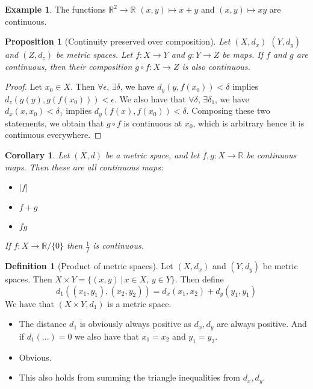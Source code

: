 \documentclass{article}
\theoremstyle{definition}
\newtheorem{defn}{Definition}[section]
\newtheorem{exmp}{Example}[section]
\theoremstyle{plain}%
\newtheorem{prop}[thm]{Proposition}
\newtheorem*{cor}{Corollary}
\theoremstyle{remark}
\begin{document}
\begin{exmp}
The functions $\mathbb{R}^2 \to \mathbb{R}$ $(x,y) \mapsto x+y$ and $(x,y) \mapsto xy$ are continuous.
\end{exmp}

\begin{prop}[Continuity preserved over composition]\label{continuity_over_comp}
Let $(X, d_x)$ $(Y,d_y)$ and $(Z,d_z)$ be metric spaces. Let $f:X \to Y$ and $g:Y \to Z$ be maps. If $f$ and $g$ are continuous, then their composition $g \circ f : X \to Z$ is also continuous.
\end{prop}

\begin{proof}
Let $x_0 \in X$. Then $\forall \epsilon$, $\exists \delta$, we have $d_y(y, f(x_0)) < \delta$ implies $d_z(g(y), g(f(x_0))) < \epsilon$. We also have that $\forall \delta$, $\exists \delta_1$, we have $d_x(x, x_0) < \delta_1$ implies $d_y(f(x), f(x_0)) < \delta$. Composing these two statements, we obtain that $g \circ f$ is continuous at $x_0$, which is arbitrary hence it is continuous everywhere.
\end{proof}

\begin{cor}
Let $(X,d)$ be a metric space, and let $f, g:X \to \mathbb{R}$ be continuous maps. Then these are all continuous maps:

\begin{itemize}
    \item $|f|$
    \item $f+g$
    \item $fg$
\end{itemize}

\begin{flushleft}
If $f:X \to \mathbb{R}/\{0\}$ then $\frac{1}{f}$ is continuous.
\end{flushleft}

\end{cor}

\begin{defn}[Product of metric spaces]
Let $(X,d_x)$ and $(Y,d_y)$ be metric spaces. Then $X \times Y = \{(x,y) \, | \, x \in X, \, y \in Y\}$. Then define \[d_1((x_1,y_1), (x_2,y_2)) = d_x(x_1, x_2) + d_y(y_1,y_1)\] We have that $(X \times Y, d_1)$ is a metric space.
\end{defn}

\begin{flushleft}
\begin{itemize}
    \item The distance $d_1$ is obviously always positive as $d_x, d_y$ are always positive. And if $d_1 (...) = 0$ we also have that $x_1=x_2$ and $y_1=y_2$. \checkmark
    \item Obvious. \checkmark
    \item This also holds from summing the triangle inequalities from $d_x, d_y$. \checkmark
\end{itemize}
\end{flushleft}
\end{document}
